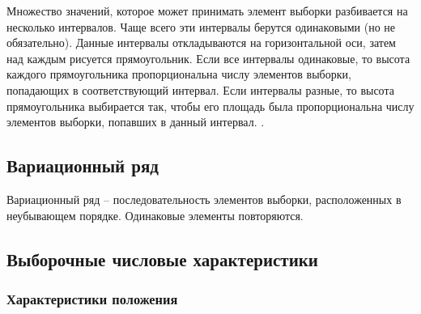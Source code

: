 Множество значений, которое может принимать элемент выборки разбивается на несколько интервалов. Чаще всего эти интервалы берутся одинаковыми (но не обязательно). Данные интервалы откладываются на горизонтальной оси, затем над каждым рисуется прямоугольник. Если все интервалы одинаковые, то высота каждого прямоугольника пропорциональна числу элементов выборки, попадающих в соответствующий интервал. Если интервалы разные, то высота прямоугольника выбирается так, чтобы его площадь была пропорциональна числу элементов выборки, попавших в данный интервал. \cite{s:hist}.

\subsection{Вариационный ряд}

Вариационный ряд -- последовательность элементов выборки, расположенных в неубывающем порядке. Одинаковые элементы повторяются. \cite[с. 409]{b:probSectMath}

\subsection{Выборочные числовые характеристики}
\cite[с. 409]{b:probSectMath}

\subsubsection{Характеристики положения}

